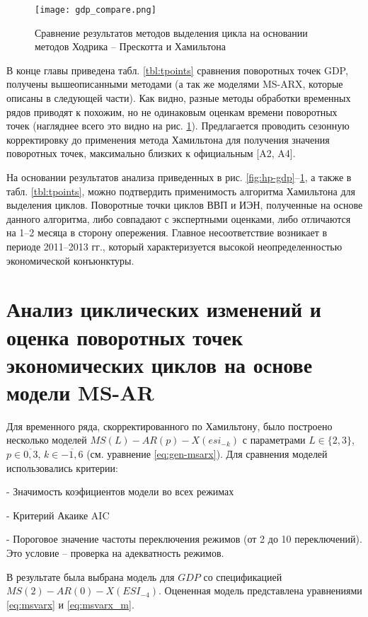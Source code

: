 \documentclass[../report.tex]{subfiles}
\begin{document}
	
	\begin{figure}
		\label{fig:gdp_compare}
		\texttt{[image: gdp\_compare.png]}
		\caption{Сравнение результатов методов выделения цикла на основании 
			методов Ходрика – Прескотта и Хамильтона}	
	\end{figure}
	
	В конце главы приведена табл. \ref{tbl:tpoints} сравнения поворотных точек GDP, получены вышеописанными методами (а так же моделями MS-ARX, которые описаны в следующей части). Как видно, разные методы обработки временных рядов приводят к похожим, но не одинаковым оценкам времени поворотных точек (нагляднее всего это видно на рис. \ref{fig:gdp_compare}). Предлагается проводить сезонную корректировку до применения метода Хамильтона для получения значения поворотных точек, максимально близких к официальным [A2, A4]. \iffalse \cite{makarevich_hse_paper,makarevich_bsu_conf_2017}.\fi
	
	На основании результатов анализа приведенных в рис. \ref{fig:hp-gdp}–\ref{fig:gdp_compare}, а также в табл. \ref{tbl:tpoints}, можно подтвердить применимость алгоритма Хамильтона для выделения циклов. Поворотные точки циклов ВВП и ИЭН, полученные на основе данного алгоритма, либо совпадают с экспертными оценками, либо отличаются на 1–2 месяца в сторону опережения. Главное несоответствие  возникает в периоде 2011–2013 гг., который характеризуется высокой неопределенностью экономической конъюнктуры.
	
	
	\section{Анализ циклических изменений и оценка поворотных точек экономических циклов на основе модели MS-AR}
	
	Для временного ряда, скорректированного по Хамильтону, было построено несколько моделей $MS(L)-AR(p)-X(esi_{-k})$ с параметрами $L \in \{2,3\}$, $p \in \overline{0,3}$, $k \in \overline{-1,6}$ (см. уравнение \ref{eq:gen-msarx}). Для сравнения моделей использовались критерии:
	
	- Значимость коэфициентов модели во всех режимах
	
	- Критерий Акаике AIC
	
	- Пороговое значение частоты переключения режимов (от 2 до 10 переключений). Это условие – проверка на адекватность режимов.
	
	В результате была выбрана модель для ${GDP}$ со спецификацией $MS(2)-AR(0)-X({ESI}_{-4})$. Оцененная модель представлена уравнениями \ref{eq:msvarx} и \ref{eq:msvarx_m}.
	
\end{document}
